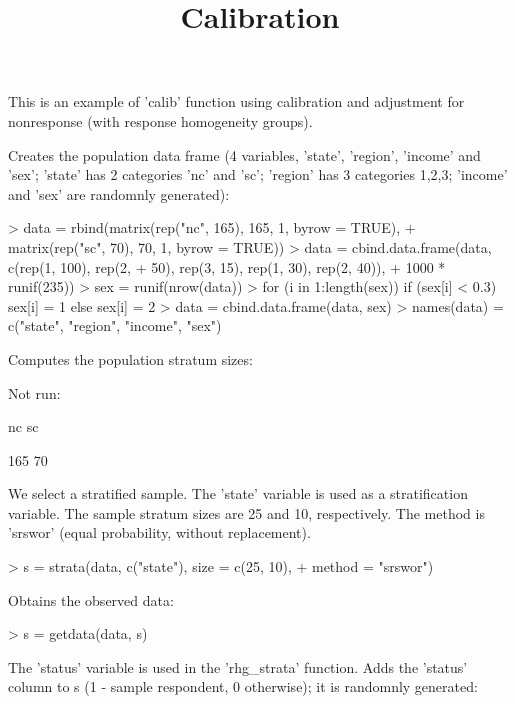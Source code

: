 \documentclass[a4paper]{article}
\title{Calibration}
\author{}
\begin{document}
\maketitle

This is an example of 'calib' function using calibration and adjustment for nonresponse (with response homogeneity groups). 


\noindent
Creates the population data frame (4 variables, 'state', 'region', 'income' and 'sex'; 
'state' has 2 categories 'nc' and 'sc'; 'region' has 3 categories 1,2,3;
'income' and 'sex' are randomnly generated):

\begin{Schunk}
\begin{Sinput}
> data = rbind(matrix(rep("nc", 165), 165, 1, byrow = TRUE), 
+     matrix(rep("sc", 70), 70, 1, byrow = TRUE))
> data = cbind.data.frame(data, c(rep(1, 100), rep(2, 
+     50), rep(3, 15), rep(1, 30), rep(2, 40)), 
+     1000 * runif(235))
> sex = runif(nrow(data))
> for (i in 1:length(sex)) if (sex[i] < 0.3) sex[i] = 1 else sex[i] = 2
> data = cbind.data.frame(data, sex)
> names(data) = c("state", "region", "income", "sex")
\end{Sinput}
\end{Schunk}
\noindent
Computes the population stratum sizes:

\begin{Schunk}
\end{Schunk}
\noindent
Not run:

nc  sc

165 70

We select a stratified sample. The 'state' variable is used as a stratification variable.
The sample stratum sizes are 25 and 10, respectively. The method is 'srswor' (equal probability, without replacement).

\begin{Schunk}
\begin{Sinput}
> s = strata(data, c("state"), size = c(25, 10), 
+     method = "srswor")
\end{Sinput}
\end{Schunk}
Obtains the observed data:

\begin{Schunk}
\begin{Sinput}
> s = getdata(data, s)
\end{Sinput}
\end{Schunk}
The 'status' variable is used in the 'rhg\_strata' function.
Adds the 'status' column to s (1 - sample respondent, 0 otherwise); it is randomnly generated:
\end{document}
